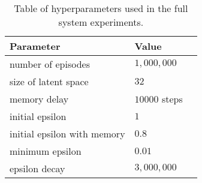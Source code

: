 \begin{table}[t]
\centering
\begin{tabular}{@{}lll@{}}
\toprule
\textbf{Parameter} & \textbf{Value} \\ \midrule
number of episodes & $1,000,000$  \\
size of latent space & $32$  \\
memory delay & $10000$ steps  \\
initial epsilon & $1$  \\
initial epsilon with memory & $0.8$  \\
minimum epsilon & $0.01$  \\
epsilon decay & $3,000,000$  \\ \bottomrule
\end{tabular}
\caption{Table of hyperparameters used in the full system experiments.\label{tab:hyperparas}}
\end{table}

